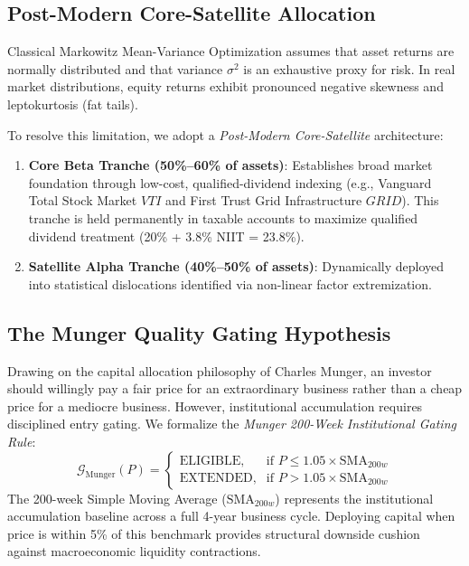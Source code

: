 \documentclass[11pt]{article}
\begin{document}
\subsection{Post-Modern Core-Satellite Allocation}

Classical Markowitz Mean-Variance Optimization assumes that asset returns are normally distributed and that variance $\sigma^2$ is an exhaustive proxy for risk. In real market distributions, equity returns exhibit pronounced negative skewness and leptokurtosis (fat tails). 

To resolve this limitation, we adopt a \textit{Post-Modern Core-Satellite} architecture:
\begin{enumerate}
    \item \textbf{Core Beta Tranche (50\%--60\% of assets)}: Establishes broad market foundation through low-cost, qualified-dividend indexing (e.g., Vanguard Total Stock Market $VTI$ and First Trust Grid Infrastructure $GRID$). This tranche is held permanently in taxable accounts to maximize qualified dividend treatment (20\% + 3.8\% NIIT = 23.8\%).
    \item \textbf{Satellite Alpha Tranche (40\%--50\% of assets)}: Dynamically deployed into statistical dislocations identified via non-linear factor extremization.
\end{enumerate}

\subsection{The Munger Quality Gating Hypothesis}

Drawing on the capital allocation philosophy of Charles Munger, an investor should willingly pay a fair price for an extraordinary business rather than a cheap price for a mediocre business. However, institutional accumulation requires disciplined entry gating. We formalize the \textit{Munger 200-Week Institutional Gating Rule}:
\begin{equation}
    \mathcal{G}_{\text{Munger}}(P) = \begin{cases}
        \text{ELIGIBLE}, & \text{if } P \le 1.05 \times \text{SMA}_{200w} \\
        \text{EXTENDED}, & \text{if } P > 1.05 \times \text{SMA}_{200w}
    \end{cases}
\end{equation}
The 200-week Simple Moving Average ($\text{SMA}_{200w}$) represents the institutional accumulation baseline across a full 4-year business cycle. Deploying capital when price is within 5\% of this benchmark provides structural downside cushion against macroeconomic liquidity contractions.
\end{document}

